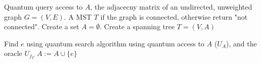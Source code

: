 \documentclass{article}
\begin{document}
\pagestyle{empty} 

\begin{algorithm}[ht]
	\caption{} 
	\begin{algorithmic}[1]

		\Require  Quantum query access to $A$, the adjacecny matrix of an undirected, unweighted graph $G=(V,E)$. 
		\Ensure A MST $T$ if the graph is connected, otherwise return "not connected".
		\vspace{10pt}
		\Statex 
		\State Create a set $A=\emptyset$. 
		\State Create a spanning tree $T=(V,A)$
		
		\State Find $e$ using quantum search algorithm using quantum access to $A$ ($U_A$), and the oracle $U_{f_T}$
		\State $A:=A \cup \{e\}$
		\EndWhile
	\end{algorithmic}
\end{algorithm}
\end{document}
